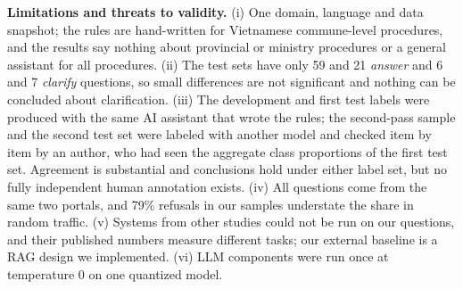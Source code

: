 \textbf{Limitations and threats to validity.} (i) One domain, language and data snapshot; the rules are hand-written for Vietnamese
commune-level procedures, and the results say nothing about provincial or ministry procedures or a general assistant for all procedures. (ii) The test
sets have only 59 and 21 \emph{answer} and 6 and 7 \emph{clarify} questions, so small differences are not significant and nothing can be
concluded about clarification. (iii) The development and first test labels were produced with the same AI assistant that wrote the rules;
the second-pass sample and the second test set were labeled with another model and checked item by item by an author, who had seen the
aggregate class proportions of the first test set. Agreement is substantial and conclusions hold under either label set, but no fully
independent human annotation exists. (iv) All questions come from the same two portals, and 79\% refusals in our samples understate the
share in random traffic. (v) Systems from other studies could not be run on our questions, and their published numbers measure different
tasks; our external baseline is a RAG design we implemented. (vi) LLM components were run once at temperature 0 on one quantized model.
